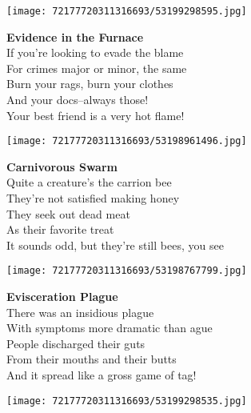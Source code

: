 \documentclass[10pt,letterpaper]{article}
\begin{document}
\begin{center}\texttt{[image: 72177720311316693/53199298595.jpg]}
\end{center}
\begin{center}
\textbf{Evidence in the Furnace}\\
\vskip 0.2in
If you're looking to evade the blame\\
For crimes major or minor, the same\\
Burn your rags, burn your clothes\\
And your docs--always those!\\
Your best friend is a very hot flame!\\
\end{center}
\pagebreak

\begin{center}
\texttt{[image: 72177720311316693/53198961496.jpg]}
\end{center}

\begin{center}
\textbf{Carnivorous Swarm}\\
\vskip 0.2in
Quite a creature's the carrion bee\\
They're not satisfied making honey\\
They seek out dead meat\\
As their favorite treat\\
It sounds odd, but they're still bees, you see\\
\end{center}
\pagebreak

\begin{center}
\texttt{[image: 72177720311316693/53198767799.jpg]}
\end{center}

\begin{center}
\textbf{Evisceration Plague}\\
\vskip 0.2in
There was an insidious plague\\
With symptoms more dramatic than ague\\
People discharged their guts\\
From their mouths and their butts\\
And it spread like a gross game of tag!\\
\end{center}
\pagebreak

\begin{center}
\texttt{[image: 72177720311316693/53199298535.jpg]}
\end{center}
\end{document}

